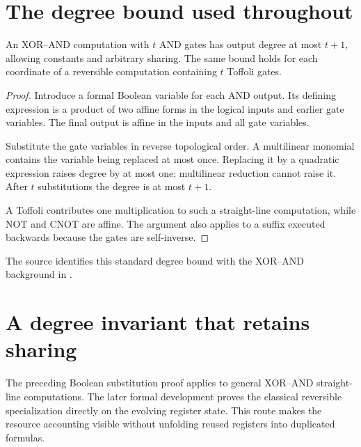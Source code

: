 \section{The degree bound used throughout}
\begin{lemma}\label{c:lem:degree}
An XOR--AND computation with $t$ AND gates has output degree at most $t+1$, allowing constants and arbitrary sharing. The same bound holds for each coordinate of a reversible computation containing $t$ Toffoli gates.
\end{lemma}
\begin{proof}
Introduce a formal Boolean variable for each AND output. Its defining expression is a product of two affine forms in the logical inputs and earlier gate variables. The final output is affine in the inputs and all gate variables.

Substitute the gate variables in reverse topological order. A multilinear monomial contains the variable being replaced at most once. Replacing it by a quadratic expression raises degree by at most one; multilinear reduction cannot raise it. After $t$ substitutions the degree is at most $t+1$.

A Toffoli contributes one multiplication to such a straight-line computation, while NOT and CNOT are affine. The argument also applies to a suffix executed backwards because the gates are self-inverse.
\end{proof}
The source identifies this standard degree bound with the XOR--AND background in \cite{c:soeken}.


\section{A degree invariant that retains sharing}
The preceding Boolean substitution proof applies to general XOR--AND straight-line computations. The later formal development proves the classical reversible specialization directly on the evolving register state. This route makes the resource accounting visible without unfolding reused registers into duplicated formulas.

